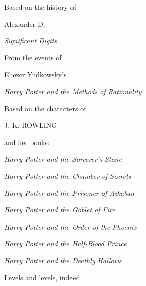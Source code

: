 \cleartoverso
\thispagestyle{empty}
\begin{center}
\vspace*{1cm}
Based on the history of
\vspace*{0.5cm}\par
\Large Alexander D. \normalsize\par
\vspace*{0.2cm}
\textit{Significant Digits}\smallskip\par
\vspace*{0.5cm}
From the events of
\vspace*{0.2cm}\par
\Large Eliezer Yudkowsky's \normalsize\par
\vspace*{0.2cm}
\textit{Harry Potter and the Methods of Rationality}\smallskip\par
\vspace*{0.5cm}\par
Based on the characters of
\vspace*{0.2cm}\par
\Large J. K. ROWLING\normalsize\par
\vspace*{0.2cm}
and her books:\par
\vspace*{0.2cm}
\def \hpOrigSeriesBook #1{  
	\textit{Harry Potter and the #1}\smallskip\par
}
\hpOrigSeriesBook{Sorcerer’s Stone}
\hpOrigSeriesBook{Chamber of Secrets}
\hpOrigSeriesBook{Prisoner of Azkaban}
\hpOrigSeriesBook{Goblet of Fire}
\hpOrigSeriesBook{Order of the Phoenix}
\hpOrigSeriesBook{Half-Blood Prince}
\hpOrigSeriesBook{Deathly Hallows}
\vspace*{1cm}
\normalsize Levels and levels, indeed \par
\vspace*{1cm}
\end{center}
\clearpage
